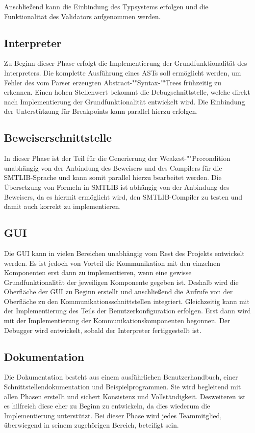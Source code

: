 
Anschließend kann die Einbindung des Typsystems erfolgen und die Funktionalität des Validators aufgenommen werden.

\subsection{Interpreter}
Zu Beginn dieser Phase erfolgt die Implementierung der Grundfunktionalität des Interpreters. Die komplette Ausführung eines ASTs soll ermöglicht werden, um Fehler des vom Parser erzeugten Abstract-""Syntax-""Trees frühzeitig zu erkennen. Einen hohen Stellenwert bekommt die Debugschnittstelle, welche direkt nach Implementierung der Grundfunktionalität entwickelt wird. Die Einbindung der Unterstützung für Breakpoints kann parallel hierzu erfolgen.

\subsection{Beweiserschnittstelle}
In dieser Phase ist der Teil für die Generierung der Weakest-""Precondition unabhängig von der Anbindung des Beweisers und des Compilers für die SMTLIB-Sprache und kann somit parallel hierzu bearbeitet werden. Die Übersetzung von Formeln in SMTLIB ist abhängig von der Anbindung des Beweisers, da es hiermit ermöglicht wird, den SMTLIB-Compiler zu testen und damit auch korrekt zu implementieren.

\subsection{GUI}
Die GUI kann in vielen Bereichen unabhängig vom Rest des Projekts entwickelt werden. Es ist jedoch von Vorteil die Kommunikation mit den einzelnen Komponenten erst dann zu implementieren, wenn eine gewisse Grundfunktionalität der jeweiligen Komponente gegeben ist. Deshalb wird die Oberfläche der GUI zu Beginn erstellt und anschließend die Aufrufe von der Oberfläche zu den Kommunikationsschnittstellen integriert. Gleichzeitig kann mit der Implementierung des Teils der Benutzerkonfiguration erfolgen. Erst dann wird mit der Implementierung der Kommunikationskomponenten begonnen. Der Debugger wird entwickelt, sobald der Interpreter fertiggestellt ist.

\subsection{Dokumentation}
Die Dokumentation besteht aus einem ausführlichen Benutzerhandbuch, einer Schnittstellendokumentation und Beispielprogrammen. Sie wird begleitend mit allen Phasen erstellt und sichert Konsistenz und Vollständigkeit. Desweiteren ist es hilfreich diese eher zu Beginn zu entwickeln, da dies wiederum die Implementierung unterstützt. Bei dieser Phase wird jedes Teammitglied, überwiegend in seinem zugehörigen Bereich, beteiligt sein.
